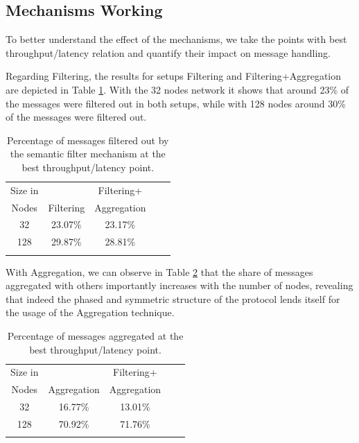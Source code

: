 \subsection{Mechanisms Working}

To better understand the effect of the mechanisms, we take the points with best throughput/latency relation and quantify their impact on message handling.   

Regarding Filtering, the results for setups Filtering and Filtering+Aggregation are depicted in Table \ref{tab:Filtering}.
With the 32 nodes network it shows that around 23\% of the messages were filtered out in both setups, while with 128 nodes around 30\% of the messages were filtered out.

\begin{table}[h!]
\centering
	\begin{tabular}{c c c c c }
	\hline
     Size in     &       &  Filtering+  \\ 
	 Nodes & Filtering    & Aggregation  \\  \hline
	32  		&	23.07\%	&  23.17\% \\
	128  		&	29.87\%	&  28.81\%  \\ \hline \\
	\end{tabular}
	\caption{Percentage of messages filtered out by the semantic filter mechanism at the best throughput/latency point.}
  \label{tab:Filtering}
\vspace{-3mm}
\end{table}

With Aggregation, we can observe in Table \ref{tab:Aggregation}
that the share of messages aggregated with others 
importantly increases with the number of nodes, revealing that indeed the phased and symmetric structure of the protocol lends itself for the usage of the Aggregation technique.

\begin{table}[h!]
\centering
	\begin{tabular}{c c c c c }
	\hline
     Size in     &       &  Filtering+  \\ 
	 Nodes & Aggregation    & Aggregation  \\  \hline
	32  		&	16.77\%	&  13.01\% \\
	128  		&	70.92\%	&  71.76\%  \\ \hline \\
	\end{tabular}
	\caption{Percentage of messages aggregated  at the best throughput/latency point.}
   \label{tab:Aggregation}
 \vspace{-5mm}
\end{table}

